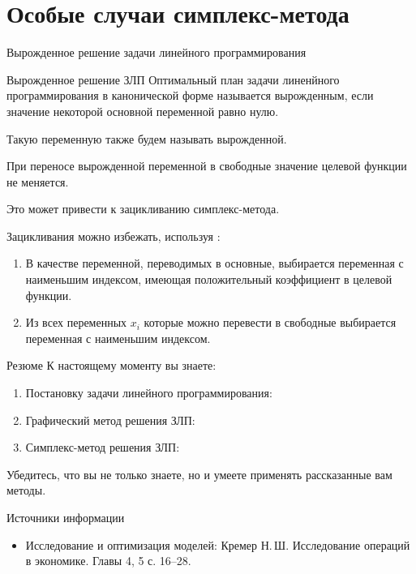 \documentclass[unicode,11pt,notheorems]{beamer}
\begin{document}
\section{Особые случаи симплекс-метода}
\begin{frame}{}{}
\centering 
\Large Вырожденное решение задачи линейного программирования
\end{frame}
\begin{frame}{Вырожденное решение ЗЛП}{}
Оптимальный план задачи линенйного программирования в канонической форме называется \alert{вырожденным}, если значение некоторой основной переменной равно нулю.

Такую переменную также будем называть вырожденной.

\bigskip

{\color{red}
При переносе вырожденной переменной в свободные значение целевой функции не меняется.

Это может привести к зацикливанию симплекс-метода.
}

\bigskip

Зацикливания можно избежать, используя :
\begin{enumerate}
\item 
	В качестве переменной, переводимых в основные, выбирается переменная с наименьшим индексом, имеющая положительный коэффициент в целевой функции.
\item 
	Из всех переменных $x_i$ которые можно перевести в свободные выбирается переменная с наименьшим индексом.
\end{enumerate}
\end{frame}



\begin{frame}{Резюме}
	К настоящему моменту вы знаете:
	\begin{enumerate}
	\item 
		Постановку  задачи линейного программирования: 
	\item 
		Графический метод  решения ЗЛП: 
	\item 
		Симплекс-метод решения ЗЛП: 
	\end{enumerate}
	Убедитесь, что вы не только знаете, но и умеете применять рассказанные вам методы.
\end{frame}

\begin{frame}{Источники информации}
\begin{itemize}
\item 
	Исследование и оптимизация моделей:  Кремер  Н.\,Ш. Исследование операций в экономике. Главы 4, 5 с. 16--28.
\end{itemize}

\end{frame}
\end{document}
